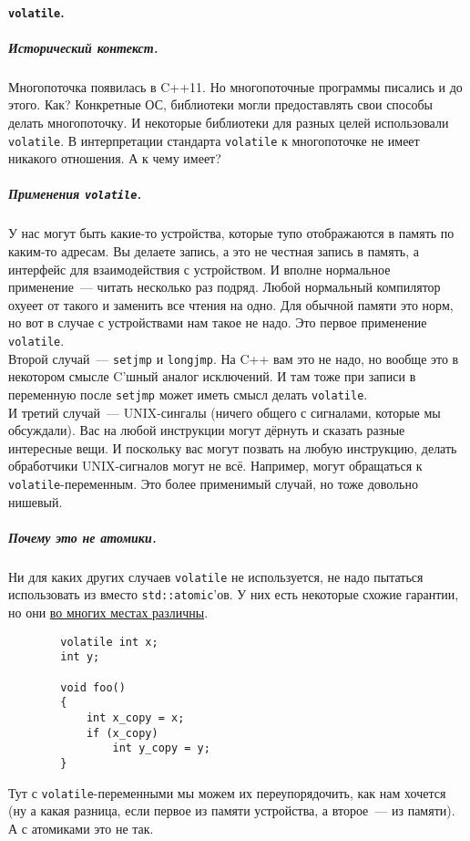 \documentclass{article}
\begin{document}
    \paragraph{\texttt{volatile}.}
    \subparagraph{Исторический контекст.}
    Многопоточка появилась в C++11. Но многопоточные программы писались и до этого. Как? Конкретные ОС, библиотеки могли предоставлять свои способы делать многопоточку. И некоторые библиотеки для разных целей использовали \texttt{volatile}. В интерпретации стандарта \texttt{volatile} к многопоточке не имеет никакого отношения. А к чему имеет?
    \subparagraph{Применения \texttt{volatile}.}
    У нас могут быть какие-то устройства, которые тупо отображаются в память по каким-то адресам. Вы делаете запись, а это не честная запись в память, а интерфейс для взаимодействия с устройством. И вполне нормальное применение~--- читать несколько раз подряд. Любой нормальный компилятор охуеет от такого и заменить все чтения на одно. Для обычной памяти это норм, но вот в случае с устройствами нам такое не надо. Это первое применение \texttt{volatile}.\\
    Второй случай~--- \texttt{setjmp} и \texttt{longjmp}. На C++ вам это не надо, но вообще это в некотором смысле C'шный аналог исключений. И там тоже при записи в переменную после \texttt{setjmp} может иметь смысл делать \texttt{volatile}.\\
    И третий случай~--- UNIX-сингалы (ничего общего с сигналами, которые мы обсуждали). Вас на любой инструкции могут дёрнуть и сказать разные интересные вещи. И поскольку вас могут позвать на любую инструкцию, делать обработчики UNIX-сигналов могут не всё. Например, могут обращаться к \texttt{volatile}-переменным. Это более применимый случай, но тоже довольно нишевый.
    \subparagraph{Почему это не атомики.}
    Ни для каких других случаев \texttt{volatile} не используется, не надо пытаться использовать из вместо \texttt{std::atomic}'ов. У них есть некоторые схожие гарантии, но они \href{https://www.drdobbs.com/parallel/volatile-vs-volatile/212701484}{во многих местах различны}.
    \begin{verbatim}
        volatile int x;
        int y;

        void foo()
        {
            int x_copy = x;
            if (x_copy)
                int y_copy = y;
        }
    \end{verbatim}
    Тут с \texttt{volatile}-переменными мы можем их переупорядочить, как нам хочется (ну а какая разница, если первое из памяти устройства, а второе~--- из памяти). А с атомиками это не так.\\
\end{document}
